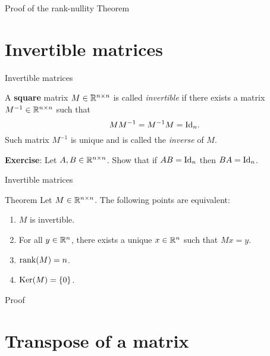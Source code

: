 \documentclass{beamer}
\begin{document}
\begin{frame}[t]{Proof of the rank-nullity Theorem}
	\grid

	\pause
	\pause
	\pause
\end{frame}

\section{Invertible matrices}

\begin{frame}[t]{Invertible matrices}
	\grid

	\vspace{-0.3cm}

	\begin{definition}\label{prop:matrix_inverse}
		A \textbf{square} matrix $M \in \mathbb{R}^{n \times n}$ is called \emph{invertible} if there exists a matrix $M^{-1} \in \mathbb{R}^{n \times n}$ such that 
		$$
		M M^{-1} = M^{-1} M = {{\rm Id}}_n.
		$$
		Such matrix $M^{-1}$ is unique and is called the \emph{inverse} of $M$.
	\end{definition}
	\textbf{Exercise}: Let $A,B \in \mathbb{R}^{n \times n}$. Show that if $AB = {{\rm Id}}_n$ then $BA = {{\rm Id}}_n$.

\end{frame}

\begin{frame}[t]{Invertible matrices}
	\grid

	\vspace{-0.3cm}

	\begin{block}{Theorem}
		Let $M \in \mathbb{R}^{n \times n}$. The following points are equivalent:
		\begin{enumerate}
			\item \label{item:th_i} $M$ is invertible.
			\item For all $y \in \mathbb{R}^n$, there exists a unique $x \in \mathbb{R}^n$ such that $Mx=y$.
			\item \label{item:th_ii} ${{\rm rank}}(M) = n$.
			\item \label{item:th_iii} ${{\rm Ker}}(M) = \{0\}$.
		\end{enumerate}
	\end{block}

\end{frame}
\begin{frame}[t]{Proof}
	\grid

	\pause
	\pause
	\pause
\end{frame}


\section{Transpose of a matrix}
\end{document}
